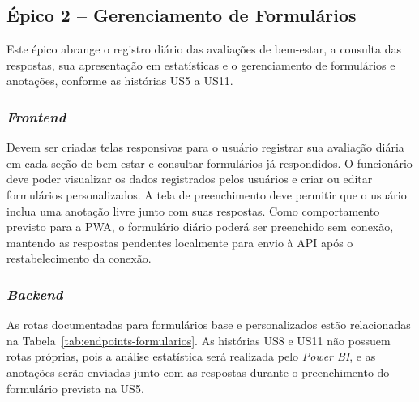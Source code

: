 \subsection{Épico 2 -- Gerenciamento de Formulários}

Este épico abrange o registro diário das avaliações de bem-estar, a consulta das respostas, sua apresentação em estatísticas e o gerenciamento de formulários e anotações, conforme as histórias US5 a US11.

\subsubsection{\textit{Frontend}}

Devem ser criadas telas responsivas para o usuário registrar sua avaliação diária em cada seção de bem-estar e consultar formulários já respondidos. O funcionário deve poder visualizar os dados registrados pelos usuários e criar ou editar formulários personalizados. A tela de preenchimento deve permitir que o usuário inclua uma anotação livre junto com suas respostas. Como comportamento previsto para a PWA, o formulário diário poderá ser preenchido sem conexão, mantendo as respostas pendentes localmente para envio à API após o restabelecimento da conexão.

\subsubsection{\textit{Backend}}

As rotas documentadas para formulários base e personalizados estão relacionadas na Tabela~\ref{tab:endpoints-formularios}. As histórias US8 e US11 não possuem rotas próprias, pois a análise estatística será realizada pelo \textit{Power BI}, e as anotações serão enviadas junto com as respostas durante o preenchimento do formulário prevista na US5.

